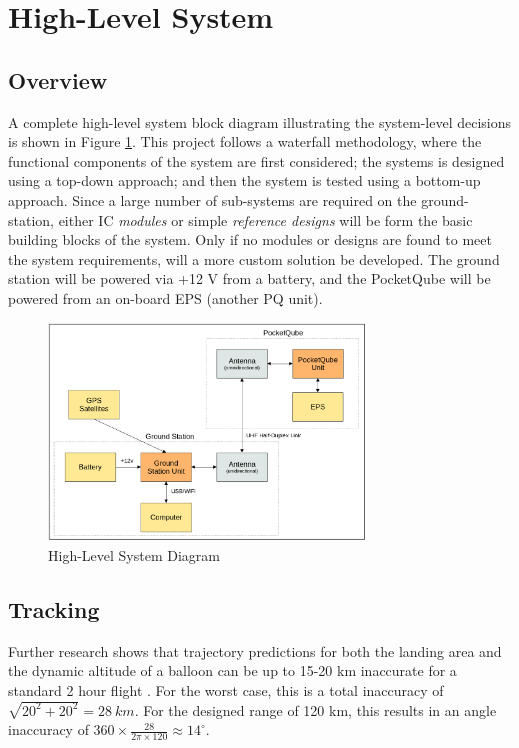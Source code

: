 \graphicspath{{./figures}}

\section{High-Level System}
\subsection{Overview}
A complete high-level system block diagram illustrating the system-level decisions is shown in Figure \ref{fig:complete_system}. This project follows a waterfall methodology, where the functional components of the system are first considered; the systems is designed using a top-down approach; and then the system is tested using a bottom-up approach. Since a large number of sub-systems are required on the ground-station, either IC \textit{modules} or simple \textit{reference designs} will be form the basic building blocks of the system. Only if no modules or designs are found to meet the system requirements, will a more custom solution be developed. The ground station will be powered via +12 V from a battery, and the PocketQube will be powered from an on-board EPS (another PQ unit).

\begin{figure}[!htb]
    \centering
    \includegraphics[width=0.75\textwidth]{complete_system.png}
    \caption{High-Level System Diagram}
    \label{fig:complete_system}
  \end{figure}

\subsection{Tracking}\label{sec:tracking}
Further research shows that trajectory predictions for both the landing area and the dynamic altitude of a balloon can be up to 15-20 km inaccurate for a standard 2 hour flight \cite{paper-balloonTrajectoryAnalysis}. For the worst case, this is a total inaccuracy of $\sqrt{20^2 + 20^2} = \SI{28}{km}$. For the designed range of 120 km, this results in an angle inaccuracy of $360 \times \frac{28}{2 \pi \times 120} \approx 14^\circ$.

